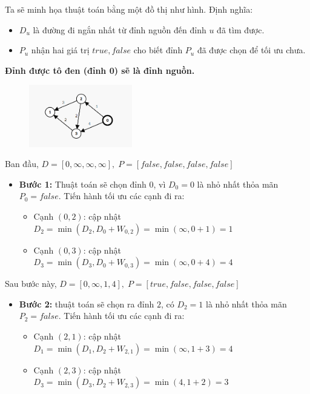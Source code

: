 \documentclass{article}
\begin{document}
Ta sẽ minh họa thuật toán bằng một đồ thị như hình. Định nghĩa:
\begin{itemize}
    \item $D_u$ là đường đi ngắn nhất từ đỉnh nguồn đến đỉnh $u$ đã tìm được.
    \item $P_u$ nhận hai giá trị $true, false$ cho biết đỉnh $P_u$ đã được chọn để tối ưu chưa.
\end{itemize}

\textbf{Đỉnh được tô đen (đỉnh 0) sẽ là đỉnh nguồn.}

\begin{figure}[h]
    \centering
    \includegraphics[width=0.4\textwidth]{img/b7/dijkstra_2.png}
\end{figure}
Ban đầu, $D = [0, \infty, \infty, \infty],\; P = [false, false, false, false]$

\begin{itemize}
    \item \textbf{Bước 1:} Thuật toán sẽ chọn đỉnh $0$, vì $D_0 = 0$ là nhỏ nhất thỏa mãn $P_0 = false$. Tiến hành tối ưu các cạnh đi ra:
    \begin{itemize}
        \item Cạnh $(0,2)$: cập nhật $D_2 = \min(D_2, D_0 + W_{0,2}) = \min(\infty, 0+1) = 1$
        \item Cạnh $(0,3)$: cập nhật $D_3 = \min(D_3, D_0 + W_{0,3}) = \min(\infty, 0+4) = 4$
    \end{itemize}
\end{itemize}

Sau bước này, $D = [0, \infty, 1, 4],\; P = [true, false, false, false]$

\begin{itemize}
    \item \textbf{Bước 2:} thuật toán sẽ chọn ra đỉnh $2$, có $D_2 = 1$ là nhỏ nhất thỏa mãn $P_2 = false$. Tiến hành tối ưu các cạnh đi ra:
    \begin{itemize}
        \item Cạnh $(2,1)$: cập nhật $D_1 = \min(D_1, D_2 + W_{2,1}) = \min(\infty, 1 + 3) = 4$
        \item Cạnh $(2,3)$: cập nhật $D_3 = \min(D_3, D_2 + W_{2,3}) = \min(4, 1 + 2) = 3$
    \end{itemize}
\end{itemize}
\end{document}
